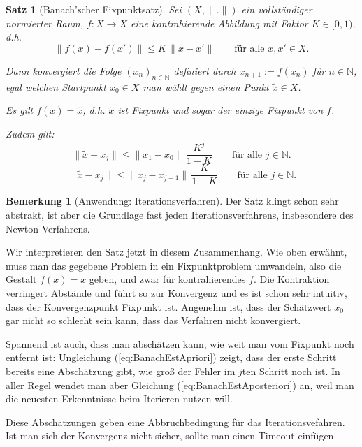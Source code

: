 \documentclass[index=totoc]{scrartcl}%
\newtheorem{thm}{Satz}[section]
\theoremstyle{definition}
\newtheorem{bem}[defi]{Bemerkung}
\newcommand{\N}{\mathbb N}
\begin{document}
\begin{thm}[Banach'scher Fixpunktsatz]
  Sei $(X, \|.\|)$ ein vollständiger normierter Raum,
  $f\colon X\to X$ eine kontrahierende Abbildung mit Faktor $K\in[0, 1)$, d.h.
  \begin{equation}\label{eq:contr}
    \|f(x)-f(x')\| \le K\,\|x-x'\| \qquad\text{für alle } x,x'\in X.     
  \end{equation}

  Dann konvergiert die Folge $(x_n)_{n\in\N}$
  definiert durch $x_{n+1}:=f(x_n)$ für $n\in\N$,
  egal welchen Startpunkt $x_0\in X$ man wählt
  gegen einen Punkt $\tilde x\in X$.

  Es gilt $f(\tilde x)=\tilde x$, d.h. $\tilde x$ ist Fixpunkt
  und  sogar der einzige Fixpunkt von $f$.

  Zudem gilt:
  \begin{equation}\label{eq:BanachEstApriori}
    \|\tilde x- x_j\| \le \|x_1-x_0\|\,\frac{K^j}{1-K}
    \qquad\text{für alle } j\in\N.     
  \end{equation}
  \begin{equation}\label{eq:BanachEstAposteriori}
    \|\tilde x- x_j\| \le \|x_j-x_{j-1}\|\,\frac{K}{1-K}
    \qquad\text{für alle } j\in\N.     
  \end{equation}
\end{thm}

\begin{bem}[Anwendung: Iterationsverfahren]
Der Satz klingt schon sehr abstrakt,
ist aber die Grundlage fast jeden Iterationsverfahrens,
insbesondere des Newton-Verfahrens.

Wir interpretieren den Satz jetzt in diesem Zusammenhang.
Wie oben erwähnt,
muss man das gegebene Problem in ein Fixpunktproblem umwandeln,
also die Gestalt $f(x)=x$ geben, und zwar für kontrahierendes $f$.
Die Kontraktion verringert Abstände und führt so zur Konvergenz
und es ist schon sehr intuitiv, dass der Konvergenzpunkt Fixpunkt ist.
Angenehm ist, dass der Schätzwert $x_0$
gar nicht so schlecht sein kann, dass das Verfahren nicht konvergiert. 

Spannend ist auch, dass man abschätzen kann,
wie weit man vom Fixpunkt noch entfernt ist:
Ungleichung (\ref{eq:BanachEstApriori}) zeigt, dass der erste Schritt bereits
eine Abschätzung gibt, wie groß der Fehler im $j$ten Schritt noch ist.
In aller Regel wendet man aber Gleichung (\ref{eq:BanachEstAposteriori}) an,
weil man die neuesten Erkenntnisse beim Iterieren nutzen will.

Diese Abschätzungen geben eine Abbruchbedingung für das Iterationsvefahren.
Ist man sich der Konvergenz nicht sicher,
sollte man einen Timeout einfügen. 
\end{bem}
\end{document}
